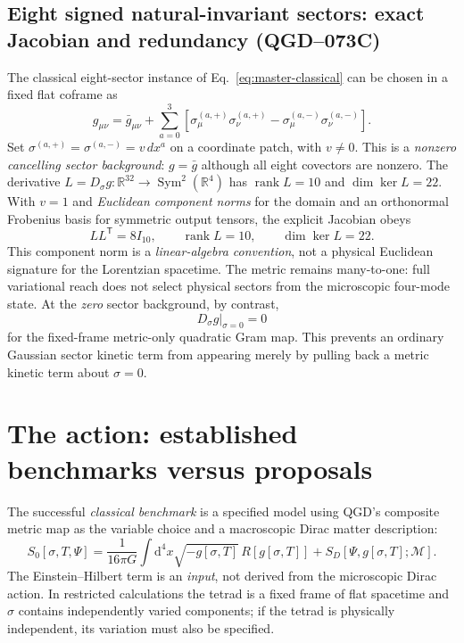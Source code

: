 \documentclass[11pt,a4paper]{article}
\newcommand{\dd}{\mathrm d}
\newcommand{\mc}{\mathcal M}
\begin{document}
\subsection{Eight signed natural-invariant sectors: exact Jacobian and redundancy (QGD--073C)}\label{sec:qgd075-signed-rank}
The classical eight-sector instance of Eq.~\eqref{eq:master-classical}
can be chosen in a fixed flat coframe as
\begin{equation}\label{eq:qgd075-eight-sectors}
 g_{\mu\nu}=\bar g_{\mu\nu}
 +\sum_{a=0}^{3}\left[
 \sigma_\mu^{(a,+)}\sigma_\nu^{(a,+)}
 -\sigma_\mu^{(a,-)}\sigma_\nu^{(a,-)}\right].
\end{equation}
Set $\sigma^{(a,+)}=\sigma^{(a,-)}=v\,dx^a$ on a coordinate
patch, with $v\ne0$. This is a \emph{nonzero cancelling sector background}:
$g=\bar g$ although all eight covectors are nonzero. The derivative
$L=D_\sigma g:\mathbb R^{32}\to\operatorname{Sym}^2(\mathbb R^4)$
has $\operatorname{rank}L=10$ and $\dim\ker L=22$.
With $v=1$ and \emph{Euclidean component norms} for the domain and an
orthonormal Frobenius basis for symmetric output tensors, the explicit
Jacobian obeys
\begin{equation}\label{eq:qgd075-L-normal}
 \boxed{LL^{\mathsf T}=8I_{10},\qquad
 \operatorname{rank}L=10,\qquad
 \dim\ker L=22.}
\end{equation}
This component norm is a \emph{linear-algebra convention}, not a
physical Euclidean signature for the Lorentzian spacetime.
The metric remains many-to-one: full variational reach does not
select physical sectors from the microscopic four-mode state.
At the \emph{zero} sector background, by contrast,
\begin{equation}\label{eq:qgd075-zero-jacobian}
 \boxed{D_\sigma g\big|_{\sigma=0}=0}
\end{equation}
for the fixed-frame metric-only quadratic Gram map. This prevents an
ordinary Gaussian sector kinetic term from appearing merely by pulling
back a metric kinetic term about $\sigma=0$.


\section{The action: established benchmarks versus proposals}\label{sec:action}
The successful \emph{classical benchmark} is a specified model using QGD's composite metric map as the variable choice and a macroscopic Dirac matter description:
\begin{equation}\label{eq:benchmark-action}
\boxed{S_0[\sigma,T,\Psi]=\frac1{16\pi G}\int\dd^4x\sqrt{-g[\sigma,T]}\,R[g[\sigma,T]]
+S_D[\Psi,g[\sigma,T];\mc].}
\end{equation}
The Einstein--Hilbert term is an \emph{input}, not derived from the microscopic Dirac action. In restricted calculations the tetrad is a fixed frame of flat spacetime and $\sigma$ contains independently varied components; if the tetrad is physically independent, its variation must also be specified.
\end{document}

